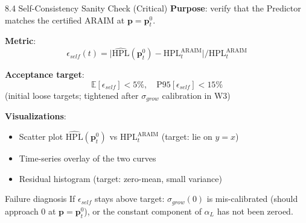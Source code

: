 \documentclass[10pt,aspectratio=169,xcolor=dvipsnames]{beamer}
\newcommand{\HPL}{\mathrm{HPL}}
\newcommand{\E}{\mathbb{E}}
\newcommand{\1}{\mathbb{1}}
\begin{document}
\begin{frame}{8.4 Self-Consistency Sanity Check (Critical)}
  \small
  \textbf{Purpose}: verify that the Predictor matches the certified ARAIM at $\bm{p}=\bm{p}_t^0$.

  \medskip
  \textbf{Metric}:
  \[
    \epsilon_{self}(t)=\bigl|\widehat{\HPL}(\bm{p}_t^0)-\HPL^{\mathrm{ARAIM}}_t\bigr|/\HPL^{\mathrm{ARAIM}}_t
  \]

  \textbf{Acceptance target}:
  \[
    \E[\epsilon_{self}]<5\%,\quad\mathrm{P95}[\epsilon_{self}]<15\%
  \]
  (initial loose targets; tightened after $\sigma_{grow}$ calibration in W3)

  \medskip
  \textbf{Visualizations}:
  \begin{itemize}\scriptsize
    \item Scatter plot $\widehat{\HPL}(\bm{p}_t^0)$ vs $\HPL^{\mathrm{ARAIM}}_t$ (target: lie on $y=x$)
    \item Time-series overlay of the two curves
    \item Residual histogram (target: zero-mean, small variance)
  \end{itemize}

  \begin{alertblock}{\small Failure diagnosis}
    \scriptsize If $\epsilon_{self}$ stays above target: $\sigma_{grow}(0)$ is mis-calibrated (should approach 0 at $\bm{p}=\bm{p}_t^0$), or the constant component of $\alpha_L$ has not been zeroed.
  \end{alertblock}
\end{frame}
\end{document}
